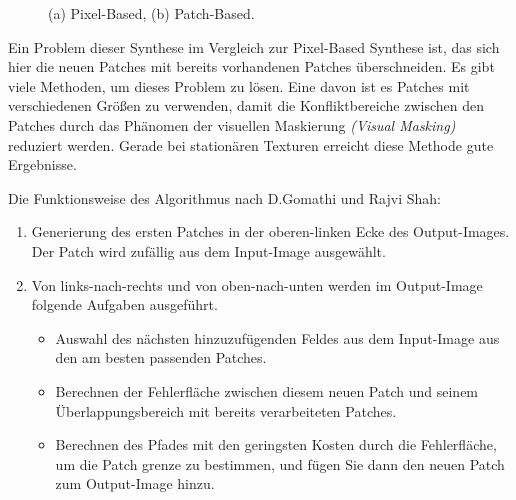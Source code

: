 \documentclass[12pt, a4paper,twoside,openright]{report}
\begin{document}
\begin{figure}[H]
    \centering
    \qquad
    \caption{(a) Pixel-Based, (b) Patch-Based.}%
\end{figure}

Ein Problem dieser Synthese im Vergleich zur Pixel-Based Synthese ist, das sich hier die neuen Patches mit bereits vorhandenen Patches überschneiden.
Es gibt viele Methoden, um dieses Problem zu lösen.
Eine davon ist es Patches mit verschiedenen Größen zu verwenden, damit die Konfliktbereiche zwischen den Patches durch das Phänomen der visuellen Maskierung
\textit{(Visual Masking)} reduziert werden.
Gerade bei stationären Texturen erreicht diese Methode gute Ergebnisse. \cite{EfrosQuilt}

Die Funktionsweise des Algorithmus nach D.Gomathi und Rajvi Shah:

\begin{enumerate}
    \item Generierung des ersten Patches in der oberen-linken Ecke des Output-Images. Der Patch wird zufällig aus dem Input-Image ausgewählt.
    \item Von links-nach-rechts und von oben-nach-unten werden im Output-Image folgende Aufgaben ausgeführt.
    \begin{itemize}
        \item Auswahl des nächsten hinzuzufügenden Feldes aus dem Input-Image aus den am besten passenden Patches.
        \item Berechnen der Fehlerfläche zwischen diesem neuen Patch und seinem Überlappungsbereich mit bereits
        verarbeiteten Patches.
        \item Berechnen des Pfades mit den geringsten Kosten durch die Fehlerfläche, um die Patch grenze zu bestimmen, und fügen Sie dann den neuen Patch zum Output-Image hinzu.
    \end{itemize}
\end{enumerate}
\end{document}
